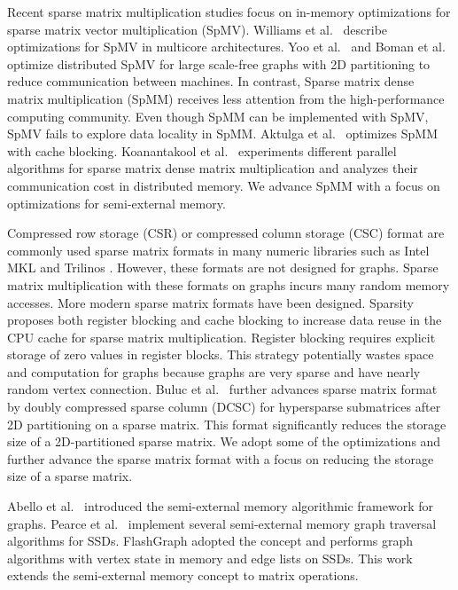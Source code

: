 Recent sparse matrix multiplication studies focus on in-memory optimizations
for sparse matrix vector multiplication (SpMV). Williams et al.~\cite{Williams07}
describe optimizations for SpMV in multicore architectures. Yoo et al.~\cite{Yoo11}
and Boman et al.~\cite{Boman2013} optimize distributed SpMV for large
scale-free graphs with 2D partitioning to reduce communication between
machines. In contrast, Sparse matrix dense matrix multiplication (SpMM) receives
less attention from the high-performance computing community. Even though
SpMM can be implemented with SpMV, SpMV fails to explore data locality in
SpMM. Aktulga et al.~\cite{Aktulga14} optimizes SpMM with cache blocking.
Koanantakool et al.~\cite{Koanantakool16} experiments different parallel
algorithms for sparse matrix dense matrix multiplication and analyzes
their communication cost in distributed memory.
We advance SpMM with a focus on optimizations for semi-external memory.

Compressed row storage (CSR) or compressed column storage (CSC) format are commonly
used sparse matrix formats in many numeric libraries such as Intel MKL \cite{mkl}
and Trilinos \cite{trilinos}. However, these formats are not designed for graphs.
Sparse matrix multiplication with these formats on graphs incurs many random memory
accesses. More modern sparse matrix formats have been designed.
Sparsity \cite{Im04} proposes both register blocking and cache blocking to
increase data reuse in the CPU cache for sparse matrix multiplication. Register blocking
requires explicit storage of zero values in register blocks. This strategy
potentially wastes space and computation for graphs because graphs are very
sparse and have nearly random vertex connection. Buluc et al.~\cite{Buluc08}
further advances sparse matrix format
by doubly compressed sparse column (DCSC) for hypersparse submatrices after 2D
partitioning on a sparse matrix. This format significantly reduces the storage
size of a 2D-partitioned sparse matrix. We adopt some of the optimizations
and further advance the sparse matrix
format with a focus on reducing the storage size of a sparse matrix.

Abello et al.~\cite{Abello98} introduced the semi-external memory algorithmic
framework for graphs. Pearce et al.~\cite{Pearce10} implement several 
semi-external memory graph traversal algorithms for SSDs. FlashGraph
\cite{flashgraph} adopted the concept and performs graph algorithms with
vertex state in memory and edge lists on SSDs. This work extends the semi-external
memory concept to matrix operations.

